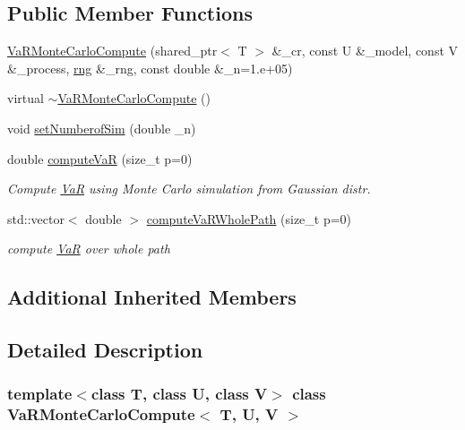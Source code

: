 \subsection*{Public Member Functions}
\begin{DoxyCompactItemize}
\item 
\hyperlink{classVaRMonteCarloCompute_a2362734a7d6eb5530984ace252361a6a}{Va\+R\+Monte\+Carlo\+Compute} (shared\+\_\+ptr$<$ T $>$ \&\+\_\+cr, const U \&\+\_\+model, const V \&\+\_\+process, \hyperlink{classrng}{rng} \&\+\_\+rng, const double \&\+\_\+n=1.e+05)
\item 
virtual \hyperlink{classVaRMonteCarloCompute_a372e6887ccaab471a23c49b3e7868fa5}{$\sim$\+Va\+R\+Monte\+Carlo\+Compute} ()
\item 
void \hyperlink{classVaRMonteCarloCompute_a3ef6b8ac6e54e0dc4cc8239926d8f236}{set\+Numberof\+Sim} (double \+\_\+n)
\item 
double \hyperlink{classVaRMonteCarloCompute_a43b5493187d834fa2ba1bdb53c353947}{compute\+VaR} (size\+\_\+t p=0)
\begin{DoxyCompactList}\small\item\em Compute \hyperlink{classVaR}{VaR} using Monte Carlo simulation from Gaussian distr. \end{DoxyCompactList}\item 
std\+::vector$<$ double $>$ \hyperlink{classVaRMonteCarloCompute_a14ea83586172f23f8bb4a60babeb812f}{compute\+Va\+R\+Whole\+Path} (size\+\_\+t p=0)
\begin{DoxyCompactList}\small\item\em compute \hyperlink{classVaR}{VaR} over whole path \end{DoxyCompactList}\end{DoxyCompactItemize}
\subsection*{Additional Inherited Members}


\subsection{Detailed Description}
\subsubsection*{template$<$class T, class U, class V$>$\newline
class Va\+R\+Monte\+Carlo\+Compute$<$ T, U, V $>$}


